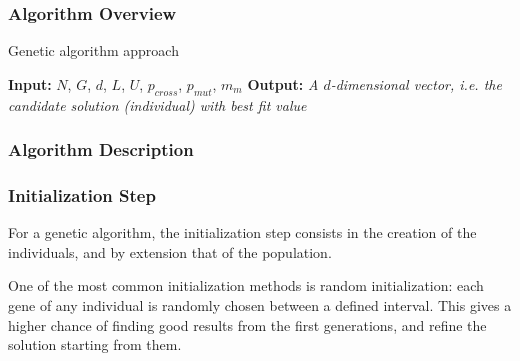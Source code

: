 \subsubsection{Algorithm Overview}

\begin{algorithm}
	\caption{Genetic algorithm approach} \label{alg:ga}
	\begin{algorithmic}
		\newline
		\textbf{Input:} $N$, $G$, $d$, $L$, $U$, $p_{cross}$, $p_{mut}$, $m_m$\newline
		\textbf{Output:} \textit{A $d$-dimensional vector, i.e. the candidate solution (individual) with best fit value}
					\EndIf
				\EndFor
			\EndFor
		\EndProcedure
	\end{algorithmic}	
\end{algorithm}

\subsubsection{Algorithm Description}
\label{sec:5.steps}
\subsubsection{Initialization Step}

For a genetic algorithm, the initialization step consists in the creation
of the individuals, and by extension that of the population.

One of the most common initialization methods is random initialization:
each gene of any individual is randomly chosen between a defined interval.
This gives a higher chance of finding good results from the first generations,
and refine the solution starting from them.

